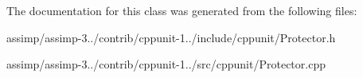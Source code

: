 The documentation for this class was generated from the following files\+:\begin{DoxyCompactItemize}
\item 
assimp/assimp-\/3../contrib/cppunit-\/1../include/cppunit/Protector.\+h\item 
assimp/assimp-\/3../contrib/cppunit-\/1../src/cppunit/Protector.\+cpp\end{DoxyCompactItemize}
